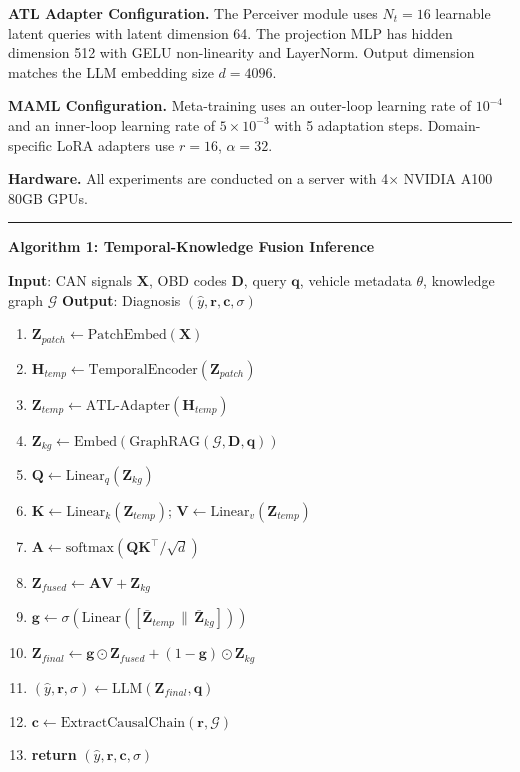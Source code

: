 \documentclass[
  11pt,
]{article}
\providecommand{\tightlist}{%
  \setlength{\itemsep}{0pt}\setlength{\parskip}{0pt}}
\begin{document}
\textbf{ATL Adapter Configuration.} The Perceiver module uses
\(N_t = 16\) learnable latent queries with latent dimension 64. The
projection MLP has hidden dimension 512 with GELU non-linearity and
LayerNorm. Output dimension matches the LLM embedding size \(d = 4096\).

\textbf{MAML Configuration.} Meta-training uses an outer-loop learning
rate of \(10^{-4}\) and an inner-loop learning rate of
\(5 \times 10^{-3}\) with 5 adaptation steps. Domain-specific LoRA
adapters use \(r = 16\), \(\alpha = 32\).

\textbf{Hardware.} All experiments are conducted on a server with
4\(\times\) NVIDIA A100 80GB GPUs.

\begin{center}\rule{0.5\linewidth}{0.5pt}\end{center}

\textbf{Algorithm 1: Temporal-Knowledge Fusion Inference}

\textbf{Input}: CAN signals \(\mathbf{X}\), OBD codes \(\mathbf{D}\),
query \(\mathbf{q}\), vehicle metadata \(\theta\), knowledge graph
\(\mathcal{G}\) \textbf{Output}: Diagnosis
\((\hat{y}, \mathbf{r}, \mathbf{c}, \sigma)\)

\begin{enumerate}
\def\labelenumi{\arabic{enumi}.}
\tightlist
\item
  \(\mathbf{Z}_{patch} \leftarrow \text{PatchEmbed}(\mathbf{X})\)
\item
  \(\mathbf{H}_{temp} \leftarrow \text{TemporalEncoder}(\mathbf{Z}_{patch})\)
\item
  \(\mathbf{Z}_{temp} \leftarrow \text{ATL-Adapter}(\mathbf{H}_{temp})\)
\item
  \(\mathbf{Z}_{kg} \leftarrow \text{Embed}(\text{GraphRAG}(\mathcal{G}, \mathbf{D}, \mathbf{q}))\)
\item
  \(\mathbf{Q} \leftarrow \text{Linear}_q(\mathbf{Z}_{kg})\)
\item
  \(\mathbf{K} \leftarrow \text{Linear}_k(\mathbf{Z}_{temp})\);
  \(\mathbf{V} \leftarrow \text{Linear}_v(\mathbf{Z}_{temp})\)
\item
  \(\mathbf{A} \leftarrow \text{softmax}(\mathbf{Q}\mathbf{K}^\top / \sqrt{d})\)
\item
  \(\mathbf{Z}_{fused} \leftarrow \mathbf{A}\mathbf{V} + \mathbf{Z}_{kg}\)
\item
  \(\mathbf{g} \leftarrow \sigma(\text{Linear}([\bar{\mathbf{Z}}_{temp} \,\|\, \bar{\mathbf{Z}}_{kg}]))\)
\item
  \(\mathbf{Z}_{final} \leftarrow \mathbf{g} \odot \mathbf{Z}_{fused} + (1 - \mathbf{g}) \odot \mathbf{Z}_{kg}\)
\item
  \((\hat{y}, \mathbf{r}, \sigma) \leftarrow \text{LLM}(\mathbf{Z}_{final}, \mathbf{q})\)
\item
  \(\mathbf{c} \leftarrow \text{ExtractCausalChain}(\mathbf{r}, \mathcal{G})\)
\item
  \textbf{return} \((\hat{y}, \mathbf{r}, \mathbf{c}, \sigma)\)
\end{enumerate}
\end{document}
